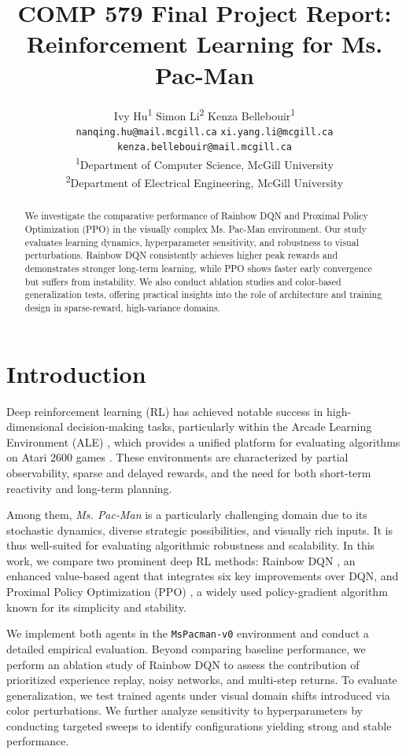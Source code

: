 \documentclass{article}
\title{COMP 579 Final Project Report: Reinforcement Learning for Ms. Pac-Man}
\author{
    Ivy Hu\textsuperscript{1} \quad
    Simon Li\textsuperscript{2} \quad
    Kenza Bellebouir\textsuperscript{1} \\
    \texttt{nanqing.hu@mail.mcgill.ca} \quad
    \texttt{xi.yang.li@mcgill.ca} \quad
    \texttt{kenza.bellebouir@mail.mcgill.ca} \\
    \textsuperscript{1}Department of Computer Science, McGill University \\
    \textsuperscript{2}Department of Electrical Engineering, McGill University
}
\begin{document}
\maketitle

\begin{abstract}
  We investigate the comparative performance of Rainbow DQN and Proximal Policy Optimization (PPO) in the visually complex Ms. Pac-Man environment. Our study evaluates learning dynamics, hyperparameter sensitivity, and robustness to visual perturbations. Rainbow DQN consistently achieves higher peak rewards and demonstrates stronger long-term learning, while PPO shows faster early convergence but suffers from instability. We also conduct ablation studies and color-based generalization tests, offering practical insights into the role of architecture and training design in sparse-reward, high-variance domains.
\end{abstract}

\section{Introduction}

Deep reinforcement learning (RL) has achieved notable success in high-dimensional decision-making tasks, particularly within the Arcade Learning Environment (ALE) \cite{ale}, which provides a unified platform for evaluating algorithms on Atari 2600 games \cite{mnih2015human}. These environments are characterized by partial observability, sparse and delayed rewards, and the need for both short-term reactivity and long-term planning.

Among them, \textit{Ms. Pac-Man} is a particularly challenging domain due to its stochastic dynamics, diverse strategic possibilities, and visually rich inputs. It is thus well-suited for evaluating algorithmic robustness and scalability. In this work, we compare two prominent deep RL methods: Rainbow DQN \cite{hessel2018rainbow}, an enhanced value-based agent that integrates six key improvements over DQN, and Proximal Policy Optimization (PPO) \cite{schulman2017proximal}, a widely used policy-gradient algorithm known for its simplicity and stability.

We implement both agents in the \texttt{MsPacman-v0} environment and conduct a detailed empirical evaluation. Beyond comparing baseline performance, we perform an ablation study of Rainbow DQN to assess the contribution of prioritized experience replay, noisy networks, and multi-step returns. To evaluate generalization, we test trained agents under visual domain shifts introduced via color perturbations. We further analyze sensitivity to hyperparameters by conducting targeted sweeps to identify configurations yielding strong and stable performance.
\end{document}
